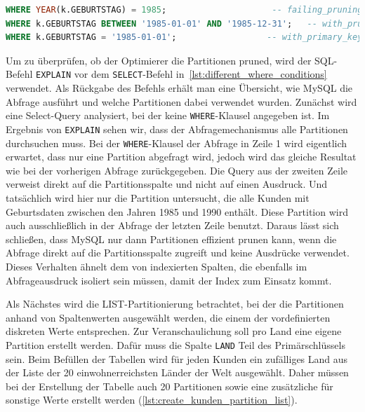 \vspace{-5pt}
\begin{lstlisting}[language=SQL,caption=Unterschiedliche WHERE-Bedingungen,label={lst:different_where_conditions}]
WHERE YEAR(k.GEBURTSTAG) = 1985;		             -- failing_pruning.sql
WHERE k.GEBURTSTAG BETWEEN '1985-01-01' AND '1985-12-31'; 	-- with_pruning.sql
WHERE k.GEBURTSTAG = '1985-01-01';		            -- with_primary_key.sql
\end{lstlisting}
\vspace{-5pt}

Um zu überprüfen, ob der Optimierer die Partitionen pruned, wird der SQL-Befehl \texttt{EXPLAIN} vor dem \texttt{SELECT}-Befehl in~\ref{lst:different_where_conditions} verwendet.
Als Rückgabe des Befehls erhält man eine Übersicht, wie MySQL die Abfrage ausführt und welche Partitionen dabei verwendet wurden.
Zunächst wird eine Select-Query analysiert, bei der keine \texttt{WHERE}-Klausel angegeben ist.
Im Ergebnis von \texttt{EXPLAIN} sehen wir, dass der Abfragemechanismus alle Partitionen durchsuchen muss.
Bei der \texttt{WHERE}-Klausel der Abfrage in Zeile 1 wird eigentlich erwartet, dass nur eine Partition abgefragt wird, jedoch wird das gleiche Resultat wie bei der vorherigen Abfrage zurückgegeben.
Die Query aus der zweiten Zeile verweist direkt auf die Partitionsspalte und nicht auf einen Ausdruck.
Und tatsächlich wird hier nur die Partition untersucht, die alle Kunden mit Geburtsdaten zwischen den Jahren 1985 und 1990 enthält.
Diese Partition wird auch ausschließlich in der Abfrage der letzten Zeile benutzt.
Daraus lässt sich schließen, dass MySQL nur dann Partitionen effizient prunen kann, wenn die Abfrage direkt auf die Partitionsspalte zugreift und keine Ausdrücke verwendet.
Dieses Verhalten ähnelt dem von indexierten Spalten, die ebenfalls im Abfrageausdruck isoliert sein müssen, damit der Index zum Einsatz kommt.

Als Nächstes wird die LIST-Partitionierung betrachtet, bei der die Partitionen anhand von Spaltenwerten ausgewählt werden, die einem der vordefinierten diskreten Werte entsprechen.
Zur Veranschaulichung soll pro Land eine eigene Partition erstellt werden.
Dafür muss die Spalte \texttt{LAND} Teil des Primärschlüssels sein.
Beim Befüllen der Tabellen wird für jeden Kunden ein zufälliges Land aus der Liste der 20 einwohnerreichsten Länder der Welt ausgewählt.
Daher müssen bei der Erstellung der Tabelle auch 20 Partitionen sowie eine zusätzliche für sonstige Werte erstellt werden (\ref{lst:create_kunden_partition_list}).

